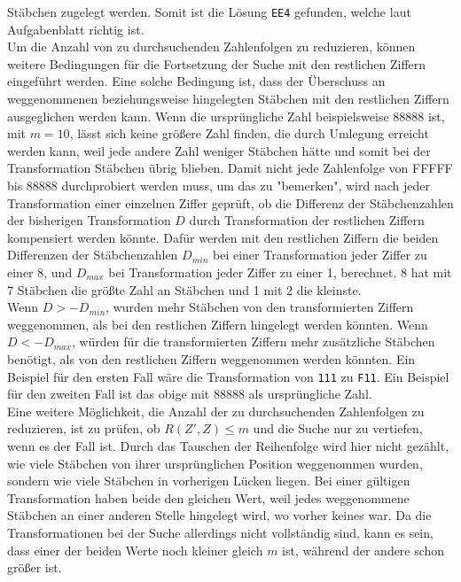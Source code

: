 \documentclass[a4paper,10pt,ngerman]{scrartcl}
\begin{document}
Stäbchen zugelegt werden. Somit ist die Lösung \lstinline|EE4| gefunden, welche laut Aufgabenblatt richtig ist. \\
Um die Anzahl von zu durchsuchenden Zahlenfolgen zu reduzieren, können weitere Bedingungen für die Fortsetzung der Suche mit den restlichen Ziffern eingeführt werden. Eine solche Bedingung ist, dass der Überschuss an weggenommenen beziehungsweise hingelegten Stäbchen mit den restlichen Ziffern ausgeglichen werden kann. Wenn die ursprüngliche Zahl beispielsweise 88888 ist, mit $m=10$, lässt sich keine größere Zahl finden, die durch Umlegung erreicht werden kann, weil jede andere Zahl weniger Stäbchen hätte und somit bei der Transformation Stäbchen übrig blieben. Damit nicht jede Zahlenfolge von FFFFF bis 88888 durchprobiert werden muss, um das zu "bemerken", wird nach jeder Transformation einer einzelnen Ziffer geprüft, ob die Differenz der Stäbchenzahlen der bisherigen Transformation $D$ durch Transformation der restlichen Ziffern kompensiert werden könnte. Dafür werden mit den restlichen Ziffern die beiden Differenzen der Stäbchenzahlen $D_{min}$ bei einer Transformation jeder Ziffer zu einer 8, und $D_{max}$ bei Transformation jeder Ziffer zu einer 1, berechnet. 8 hat mit 7 Stäbchen die größte Zahl an Stäbchen und 1 mit 2 die kleinste.\\ Wenn $D > -D_{min}$, wurden mehr Stäbchen von den transformierten Ziffern weggenommen, als bei den restlichen Ziffern hingelegt werden könnten. Wenn $D < -D_{max}$, würden für die transformierten Ziffern mehr zusätzliche Stäbchen benötigt, als von den restlichen Ziffern weggenommen werden könnten. Ein Beispiel für den ersten Fall wäre die Transformation von \lstinline|111| zu \lstinline|F11|. Ein Beispiel für den zweiten Fall ist das obige mit 88888 als ursprüngliche Zahl. \\
Eine weitere Möglichkeit, die Anzahl der zu durchsuchenden Zahlenfolgen zu reduzieren, ist zu prüfen, ob $R(Z', Z) \leq m$ und die Suche nur zu vertiefen, wenn es der Fall ist. Durch das Tauschen der Reihenfolge wird hier nicht gezählt, wie viele Stäbchen von ihrer ursprünglichen Position weggenommen wurden, sondern wie viele Stäbchen in vorherigen Lücken liegen. Bei einer gültigen Transformation haben beide den gleichen Wert, weil jedes weggenommene Stäbchen an einer anderen Stelle hingelegt wird, wo vorher keines war. Da die Transformationen bei der Suche allerdings nicht vollständig sind, kann es sein, dass einer der beiden Werte noch kleiner gleich $m$ ist, während der andere schon größer ist. \\
\end{document}
